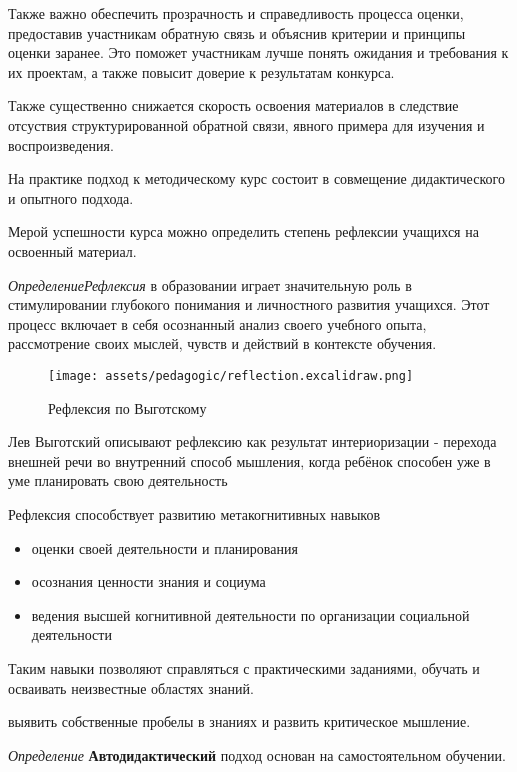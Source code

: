 Также важно обеспечить прозрачность и справедливость процесса оценки, предоставив участникам обратную связь и объяснив критерии и принципы оценки заранее. Это поможет участникам лучше понять ожидания и требования к их проектам, а также повысит доверие к результатам конкурса.


Также существенно снижается скорость освоения материалов в следствие отсуствия
 структурированной обратной связи, явного примера для изучения и воспроизведения.

На практике подход к методическому курс состоит в совмещение дидактического и опытного подхода. 


Мерой успешности курса можно определить степень рефлексии учащихся на освоенный материал.

\textit{Определение}\textit{Рефлексия} в образовании играет значительную роль в 
стимулировании глубокого понимания и личностного развития учащихся. 
Этот процесс включает в себя осознанный анализ своего учебного опыта, 
рассмотрение своих мыслей, чувств и действий в контексте обучения.


\begin{figure}[h]
    \centering
    \texttt{[image: assets/pedagogic/reflection.excalidraw.png]}
    \caption{Рефлексия по Выготскому \cite{выготский2014мышление}}
    \label{reflection}
\end{figure}

Лев Выготский описывают рефлексию как результат интериоризации -
перехода внешней речи во внутренний способ мышления, когда ребёнок способен уже в уме планировать свою деятельность 

Рефлексия способствует развитию метакогнитивных навыков \begin{itemize}
    \item оценки своей деятельности и планирования
    \item осознания ценности знания и социума
    \item ведения высшей когнитивной деятельности по организации социальной деятельности
\end{itemize}
Таким навыки позволяют справляться с практическими заданиями, обучать и осваивать неизвестные областях знаний.

выявить собственные пробелы в знаниях и развить критическое мышление.


\textit{Определение} \textbf{Автодидактический} подход основан на самостоятельном обучении. 








